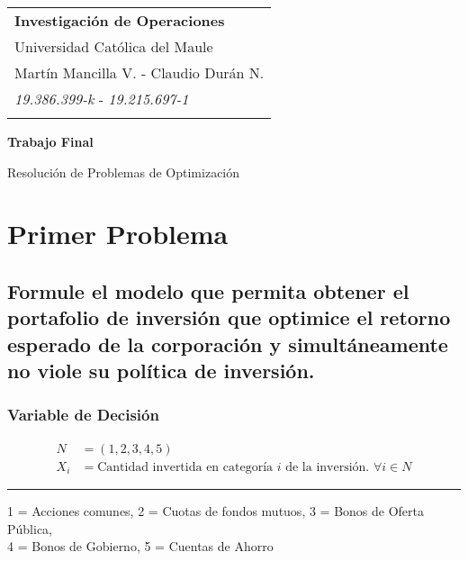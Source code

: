 \documentclass[a4paper,12pt]{article}
\begin{document}
	
\thispagestyle{empty}

\begin{tabular}{p{15.5cm}}
	{\large \bf Investigación de Operaciones} \\
	Universidad Católica del Maule \\ Martín Mancilla V. - Claudio Durán N.\\
	\textit{19.386.399-k} - \textit{19.215.697-1} \\
	\hline
	\\
\end{tabular}

\vspace*{0.3cm}

\begin{center}
	{\Large \bf Trabajo Final} 
	\vspace{2mm}
	
	{Resolución de Problemas de Optimización}
	
\end{center}  

\vspace{0.4cm}

\section{Primer Problema}
\subsection{Formule  el  modelo  que  permita  obtener  el  portafolio de  inversión  que  optimice  el  retorno  esperado  de  la	corporación y simultáneamente no viole su política de inversión.}
\subsubsection{Variable de Decisión}
\begin{equation*}
	\begin{split}
		N &= (1,2,3,4,5) \\
		X_i & = \text{Cantidad invertida en categoría } i \text{ de la inversión. } \forall i \in N
	\end{split}
\end{equation*}
\begin{center}
	\noindent\rule{12cm}{0.4pt}
\end{center}
\begin{shadedbox}
1 = Acciones comunes, 2 = Cuotas de fondos mutuos, 3 = Bonos de Oferta Pública,\\ 4 = Bonos de Gobierno, 5 = Cuentas de Ahorro
\end{shadedbox}
\end{document}
